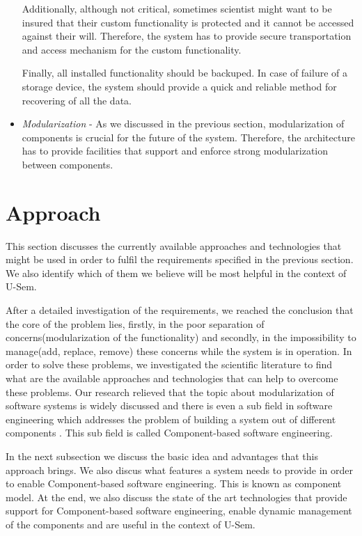 \begin{itemize}
	Additionally, although not critical, sometimes scientist might want to be insured that their custom functionality is protected and it cannot be accessed against their will. Therefore, the system has to provide secure transportation and access mechanism for the custom functionality.
	
	Finally, all installed functionality should be backuped. In case of failure of a storage device, the system should provide a quick and reliable method for recovering of all the data.
	
	\item \textit{Modularization} - As we discussed in the previous section, modularization of components is crucial for the future of the system. Therefore, the architecture has to provide facilities that support and enforce strong modularization between components.
	
\end{itemize}

\section{Approach}
\label{sec:approach}

This section discusses the currently available approaches and technologies that might be used in order to fulfil the requirements specified in the previous section. We also identify which of them we believe will be most helpful in the context of U-Sem.

After a detailed investigation of the requirements, we reached the conclusion that the core of the problem lies, firstly, in the poor separation of concerns(modularization of the functionality) and secondly, in the impossibility to manage(add, replace, remove) these concerns while the system is in operation. In order to solve these problems, we investigated the scientific literature to find what are the available approaches and technologies that can help to overcome these problems. Our research relieved that the topic about modularization of software systems is widely discussed and there is even a sub field in software engineering which addresses the problem of building a system out of different components \cite{Jifeng}. This sub field is called Component-based software engineering. 

In the next subsection we discuss the basic idea and advantages that this approach brings. We also discus what features a system needs to provide in order to enable Component-based software engineering. This is known as component model. At the end, we also discuss the state of the art technologies that provide support for Component-based software engineering, enable dynamic management of the components and are useful in the context of U-Sem. 

